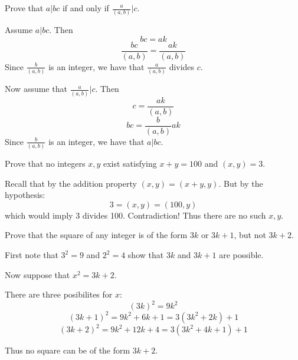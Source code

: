 \begin{questions}
    \question[5] Prove that $a|bc$ if and only if $\frac{a}{(a, b)} |
    c$.

    \begin{solution}
      Assume $a|bc$. Then 
      $$bc = ak$$
      $$\frac{bc}{(a, b)} = \frac{ak}{(a, b)}$$
      Since $\frac{b}{(a, b)}$ is an integer, we have that
      $\frac{a}{(a, b)}$ divides $c$.

      Now assume that $\frac{a}{(a, b)} | c$. Then
      $$c = \frac{ak}{(a, b)}$$
      $$bc = \frac{b}{(a, b)} ak$$
      Since $\frac{b}{(a, b)}$ is an integer, we have that $a | bc$.
    \end{solution}

    \question[5] Prove that no integers $x, y$ exist satisfying $x + y
    = 100$ and $(x, y) = 3$.
    
    \begin{solution}
      Recall that by the addition property $(x, y) = (x + y, y)$. But
      by the hypothesis:
      $$3 = (x, y) = (100, y)$$
      which would imply 3 divides 100. Contradiction! Thus there are
      no such $x, y$.
    \end{solution}

    \question[3] Prove that the square of any integer is of the form
    $3k$ or $3k+1$, but not $3k+2$.

    \begin{solution}
      First note that $3^2 = 9$ and $2^2 = 4$ show that $3k$ and
      $3k+1$ are possible.

      Now suppose that $x^2 = 3k+2$. 

      There are three posibilites for $x$:
      $$(3k)^2 = 9k^2$$
      $$(3k+1)^2 = 9k^2 + 6k + 1 = 3(3k^2 + 2k) + 1$$
      $$(3k+2)^2 = 9k^2 + 12k + 4 = 3(3k^2 + 4k + 1) + 1$$

      Thus no square can be of the form $3k+2$.
    \end{solution}

\end{questions}


